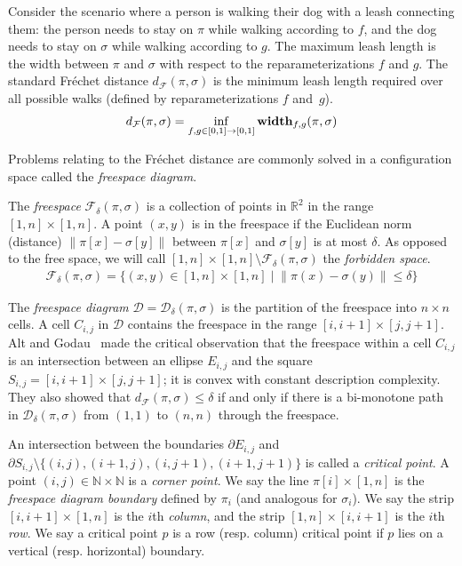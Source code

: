 \documentclass[thm-restate]{lipics-v2021}
\theoremstyle{remark}
\newcommand{\abse}[1]{\lVert #1 \rVert}
\newcommand{\Frechet}{Fréchet }
\newcommand{\boundary}[1]{\partial #1}
\newcommand{\df}[1]{d_{\mathcal{F}}(#1)}
\newcommand{\fd}[2]{\mathcal{D}_{#2}(#1)}
\newcommand{\D}{\mathcal{D}}
\newcommand{\reals}[0]{\mathbb{R}}
\newcommand{\cell}[1]{C_{#1}}
\newcommand{\freespace}[2]{\mathcal{F}_{#2}(#1)}
\begin{document}
Consider the scenario where a person is walking their dog with a leash connecting them: the person needs to stay on $\pi$ while walking according to $f$, and the dog needs to stay on $\sigma$ while walking according to $g$. The maximum leash length is the width between $\pi$ and $\sigma$ with respect to the reparameterizations $f$ and $g$. The standard \Frechet distance $\df{\pi, \sigma}$ is the minimum leash length required over all possible walks (defined by reparameterizations $f$ and~$g$).
\begin{align*}
    \df{\pi, \sigma} = \inf_{f, g \in [0, 1] \rightarrow [0, 1]} \width_{f, g}(\pi, \sigma)
\end{align*}

\newcommand{\freespaceDiagram}[3]{\mathcal{D}_{#3}(#1, #2)}
Problems relating to the \Frechet distance are commonly solved in a configuration space called the \emph{freespace diagram}.

The \emph{freespace} $\freespace{\pi, \sigma}{\delta}$ is a collection of points in $\reals^2$ in the range $[1, n] \times [1, n]$. A point $(x, y)$ is in the freespace if the Euclidean norm (distance) $\abse{\pi[x] - \sigma[y]}$ between $\pi[x]$ and $\sigma[y]$ is at most $\delta$.  As opposed to the free space, we will call $[1, n] \times [1, n] \setminus \freespace{\pi, \sigma}{\delta}$ the \emph{forbidden space}. 
\begin{align*}
    \freespace{\pi, \sigma}{\delta} = \{(x, y) \in [1, n] \times [1, n] \mid \abse{\pi(x) - \sigma(y)} \leq \delta\}
\end{align*}

The \emph{freespace diagram} $\D = \fd{\pi, \sigma}{\delta}$ is the partition of the freespace into $n \times n$ cells. A cell $\cell{i, j}$ in $\D$ contains the freespace  in the range $[i, i + 1] \times [j, j + 1]$. 
Alt and Godau~\cite{altComputingFrechetDistance1995} made the critical observation that the freespace within a cell $\cell{i, j}$ is an intersection between an ellipse $E_{i, j}$ and the square $S_{i, j} = [i, i + 1] \times [j, j + 1]$; it is convex with constant description complexity. They also showed that $\df{\pi, \sigma} \leq \delta$ if and only if there is a bi-monotone path in $\fd{\pi, \sigma}{\delta}$ from $(1, 1)$ to $(n, n)$ through the freespace. 

An intersection between the boundaries $\boundary{E_{i, j}}$ and $\boundary{S_{i, j}}\setminus\{(i, j), (i+1, j), (i, j+1), (i+1, j+1)\}$ is called a \emph{critical point}. A point $(i, j) \in \mathbb{N} \times \mathbb{N}$ is a \emph{corner point}. We say the line $\pi[i] \times [1, n]$ is the \emph{freespace diagram boundary} defined by $\pi_i$ (and analogous for $\sigma_i$). We say the strip $[i, i + 1] \times [1, n]$ is the $i$th \emph{column}, and the strip $[1, n] \times [i, i + 1]$ is the $i$th \emph{row}. We say a critical point $p$ is a row (resp. column) critical point if $p$ lies on a vertical (resp. horizontal) boundary. 
\end{document}
